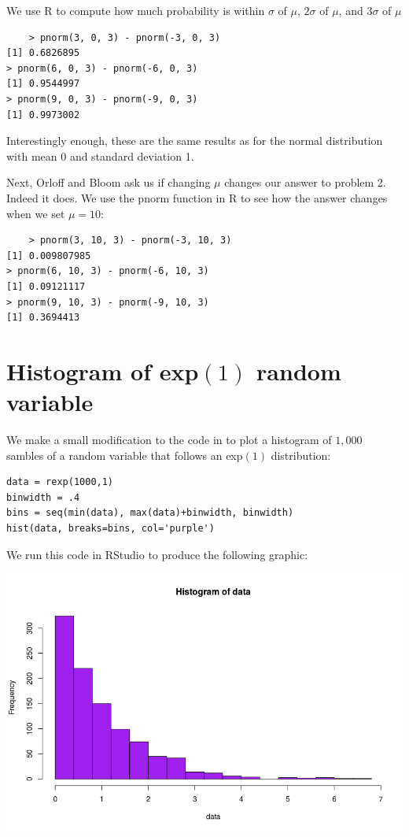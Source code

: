 \documentclass[a4paper,11pt]{article}
\begin{document}
We use R to compute how much probability is within $\sigma$ of $\mu$, $2\sigma$
of $\mu$, and $3\sigma$ of $\mu$

\begin{lstlisting}
	> pnorm(3, 0, 3) - pnorm(-3, 0, 3)
[1] 0.6826895
> pnorm(6, 0, 3) - pnorm(-6, 0, 3)
[1] 0.9544997
> pnorm(9, 0, 3) - pnorm(-9, 0, 3)
[1] 0.9973002
\end{lstlisting}

Interestingly enough, these are the same results as for the normal distribution
with mean 0 and standard deviation 1.

Next, Orloff and Bloom ask us if changing $\mu$ changes our answer to problem
2.  Indeed it does.  We use the pnorm function in R to see how the answer
changes when we set $\mu = 10$:

\begin{lstlisting}
	> pnorm(3, 10, 3) - pnorm(-3, 10, 3)
[1] 0.009807985
> pnorm(6, 10, 3) - pnorm(-6, 10, 3)
[1] 0.09121117
> pnorm(9, 10, 3) - pnorm(-9, 10, 3)
[1] 0.3694413
\end{lstlisting}

\section{Histogram of exp$\left(1 \right)$ random variable}

We make a small modification to the code in \cite{studio3r} to plot a histogram
of $1,000$ sambles of a random variable that follows an exp$\left(1 \right)$
distribution:

\begin{lstlisting}
data = rexp(1000,1)
binwidth = .4
bins = seq(min(data), max(data)+binwidth, binwidth)
hist(data, breaks=bins, col='purple')
\end{lstlisting}

We run this code in RStudio to produce the following graphic:

\includegraphics[scale=0.5]{histogram-exp-1}
\end{document}
